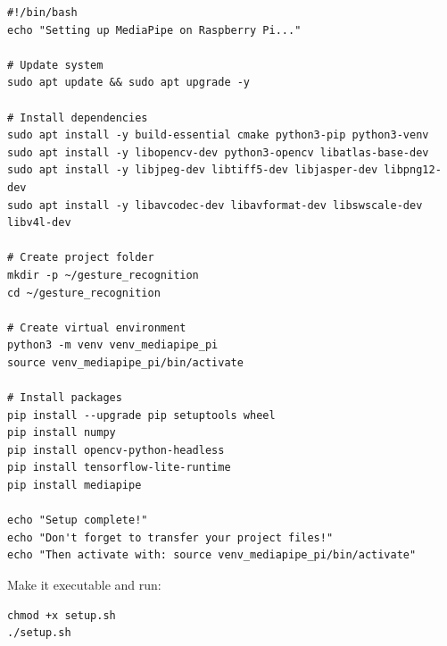 \documentclass[12pt,a4paper]{article}
\begin{document}
\begin{lstlisting}
#!/bin/bash
echo "Setting up MediaPipe on Raspberry Pi..."

# Update system
sudo apt update && sudo apt upgrade -y

# Install dependencies
sudo apt install -y build-essential cmake python3-pip python3-venv
sudo apt install -y libopencv-dev python3-opencv libatlas-base-dev
sudo apt install -y libjpeg-dev libtiff5-dev libjasper-dev libpng12-dev
sudo apt install -y libavcodec-dev libavformat-dev libswscale-dev libv4l-dev

# Create project folder
mkdir -p ~/gesture_recognition
cd ~/gesture_recognition

# Create virtual environment
python3 -m venv venv_mediapipe_pi
source venv_mediapipe_pi/bin/activate

# Install packages
pip install --upgrade pip setuptools wheel
pip install numpy
pip install opencv-python-headless
pip install tensorflow-lite-runtime
pip install mediapipe

echo "Setup complete!"
echo "Don't forget to transfer your project files!"
echo "Then activate with: source venv_mediapipe_pi/bin/activate"
\end{lstlisting}

Make it executable and run:
\begin{lstlisting}
chmod +x setup.sh
./setup.sh
\end{lstlisting}
\end{document}
